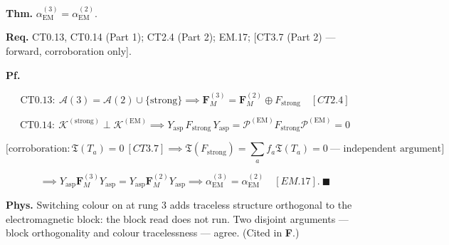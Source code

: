 \begin{theorem}\label{tag:EM-18}
\textbf{Thm.} $ \alpha_{\mathrm{EM}}^{(3)}=\alpha_{\mathrm{EM}}^{(2)}.$

\textbf{Req.} CT0.13, CT0.14 (Part 1); CT2.4 (Part 2); EM.17; [CT3.7 (Part 2) — forward, corroboration only].

\textbf{Pf.}

\[
\mathrm{CT0.13}:\ \mathcal A(3)=\mathcal A(2)\cup\{\mathrm{strong}\}\implies\mathbf F_M^{(3)}=\mathbf F_M^{(2)}\oplus F_{\mathrm{strong}}\quad[CT2.4]
\]

\[
\mathrm{CT0.14}:\ \mathcal K^{(\mathrm{strong})}\perp\mathcal K^{(\mathrm{EM})}\implies
Y_{\mathrm{asp}}\,F_{\mathrm{strong}}\,Y_{\mathrm{asp}}=\mathcal P^{(\mathrm{EM})}F_{\mathrm{strong}}\mathcal P^{(\mathrm{EM})}=0
\]

\[
\bigl[\text{corroboration}: \mathfrak T(T_a)=0\ [CT3.7]\implies\mathfrak T(F_{\mathrm{strong}})=\textstyle\sum_af_a\mathfrak T(T_a)=0\ \text{--- independent argument}\bigr]
\]

\[
\implies Y_{\mathrm{asp}}\mathbf F_M^{(3)}Y_{\mathrm{asp}}=Y_{\mathrm{asp}}\mathbf F_M^{(2)}Y_{\mathrm{asp}}\implies\alpha_{\mathrm{EM}}^{(3)}=\alpha_{\mathrm{EM}}^{(2)}\quad[EM.17].\ \blacksquare
\]

\textbf{Phys.} Switching colour on at rung 3 adds traceless structure orthogonal to the electromagnetic block: the block read does not run. Two disjoint arguments — block orthogonality and colour tracelessness — agree. (Cited in \textbf{F}.)

\end{theorem}

